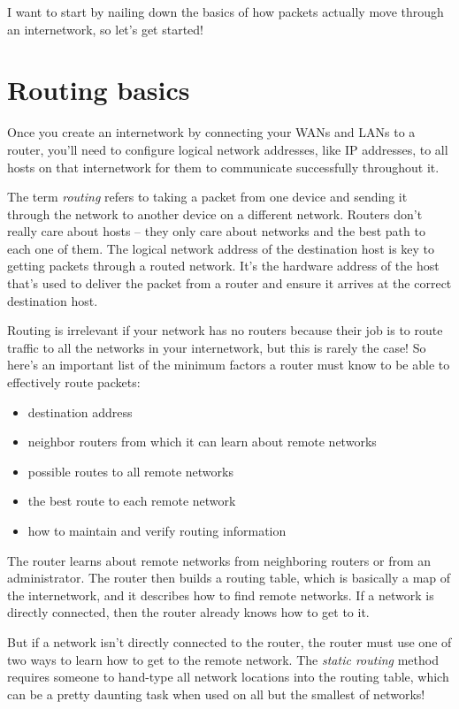 I want to start by nailing down the basics of how packets actually move through an internetwork, so let's get started!



\section{Routing basics}

Once you create an internetwork by connecting your WANs and LANs to a
router, you'll need to configure logical network addresses, like IP
addresses, to all hosts on that internetwork for them to communicate
successfully throughout it.

The term \emph{routing} refers to taking a packet from one device and
sending it through the network to another device on a different network.
Routers don't really care about hosts -- they only care about networks
and the best path to each one of them. The logical network address of
the destination host is key to getting packets through a routed network.
It's the hardware address of the host that's used to deliver the packet
from a router and ensure it arrives at the correct destination host.

Routing is irrelevant if your network has no routers because their job
is to route traffic to all the networks in your internetwork, but this
is rarely the case! So here's an important list of the minimum factors a
router must know to be able to effectively route packets:

\begin{itemize}
\item destination address
\item neighbor routers from which it can learn about remote networks
\item possible routes to all remote networks
\item the best route to each remote network
\item how to maintain and verify routing information
\end{itemize}

The router learns about remote networks from neighboring routers or from
an administrator. The router then builds a routing table, which is
basically a map of the internetwork, and it describes how to find remote
networks. If a network is directly connected, then the router already
knows how to get to it.

But if a network isn't directly connected to the router, the router must
use one of two ways to learn how to get to the remote network. The
\emph{static routing} method requires someone to hand-type all network
locations into the routing table, which can be a pretty daunting task
when used on all but the smallest of networks!

